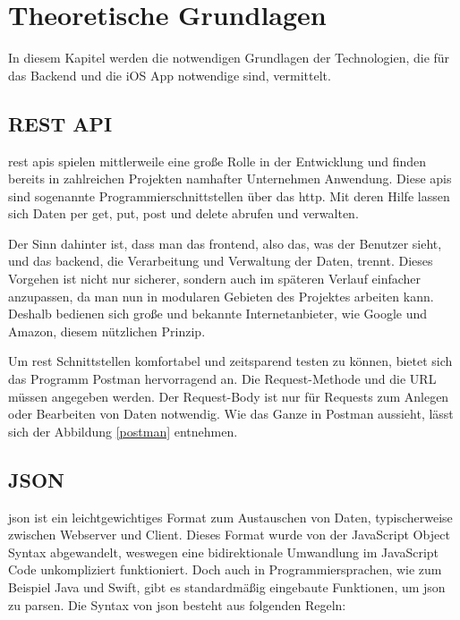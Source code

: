 \chapter{Theoretische Grundlagen}
In diesem Kapitel werden die notwendigen Grundlagen der Technologien, die für das Backend und die iOS App notwendige sind, vermittelt.

\section{REST API}
\gls{rest} \glspl{api} spielen mittlerweile eine große Rolle in der Entwicklung und finden bereits in zahlreichen Projekten namhafter Unternehmen Anwendung. Diese \glspl{api} sind sogenannte Programmierschnittstellen über das \gls{http}. Mit deren Hilfe lassen sich Daten per \gls{get}, \gls{put}, \gls{post} und \gls{delete} abrufen und verwalten.

Der Sinn dahinter ist, dass man das \gls{frontend}, also das, was der Benutzer sieht, und das \gls{backend}, die Verarbeitung und Verwaltung der Daten, trennt. Dieses Vorgehen ist nicht nur sicherer, sondern auch im späteren Verlauf einfacher anzupassen, da man nun in modularen Gebieten des Projektes arbeiten kann. Deshalb bedienen sich große und bekannte Internetanbieter, wie Google und Amazon, diesem nützlichen Prinzip.

Um \gls{rest} Schnittstellen komfortabel und zeitsparend testen zu können, bietet sich das Programm Postman \cite{postman} hervorragend an.
Die Request-Methode und die URL müssen angegeben werden. Der Request-Body ist nur für Requests zum Anlegen oder Bearbeiten von Daten notwendig. Wie das Ganze in Postman aussieht, lässt sich der Abbildung \ref{postman} entnehmen.


\clearpage

\section{JSON}
\gls{json} ist ein leichtgewichtiges Format zum Austauschen von Daten, typischerweise zwischen Webserver und Client.
Dieses Format wurde von der JavaScript Object Syntax abgewandelt, weswegen eine bidirektionale Umwandlung im JavaScript Code unkompliziert funktioniert.
Doch auch in Programmiersprachen, wie zum Beispiel Java und Swift, gibt es standardmäßig eingebaute Funktionen, um \gls{json} zu parsen.
Die Syntax von \gls{json} besteht aus folgenden Regeln:

